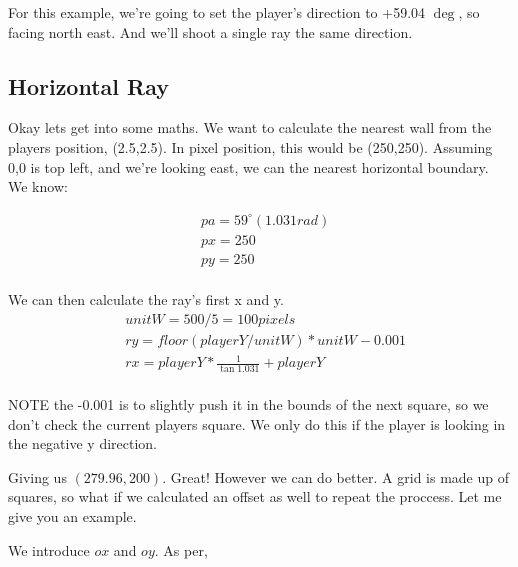 \documentclass{article}
\newcommand{\grid}[0]{
        \draw[step=1cm,color=gray] (0,0) grid (5,5);
        
        \foreach \y in {0.5,1.5,2.5,3.5,4.5}
          \foreach \x in {0.5,4.5}
            \node at (\x,\y) {1};
        
        \foreach \y in {0.5,4.5}
            \foreach \x in {1.5,2.5,3.5}
              \node at (\x,\y) {1};
        \node at (2.5,2.5) {\textsf{P}};
}
\begin{document}
For this example, we're going to set the player's direction to +59.04 $\deg$, so facing north east.
And we'll shoot a single ray the same direction. 

\subsection{Horizontal Ray}

\begin{center}
\end{center}

Okay lets get into some maths. We want to calculate the nearest wall from the players position,
(2.5,2.5). In pixel position, this would be (250,250). Assuming 0,0 is top left, and we're 
looking east, we can the nearest horizontal boundary. We know:

\begin{equation}
    \begin{split}
        & pa = 59^\circ  (1.031rad) \\
        & px = 250 \\
        & py = 250 \\
    \end{split}
\end{equation}

We can then calculate the ray's first x and y.
\begin{equation}
\begin{split}
    & unitW = 500 / 5 = 100 pixels \\
    & ry = floor (playerY / unitW ) * unitW - 0.001 \\
    & rx = playerY * \frac{1}{\tan 1.031} + playerY \\
\end{split}
\end{equation}

NOTE the -0.001 is to slightly push it in the bounds of the next square, so we don't check the 
current players square. We only do this if the player is looking in the negative y direction.

Giving us $(279.96, 200)$. Great! However we can do better. A grid is made up of squares, so what if
we calculated an offset as well to repeat the proccess. Let me give you an example.

We introduce $ox$ and $oy$. As per,
\end{document}
